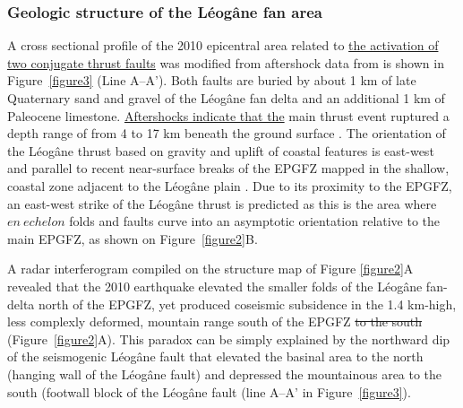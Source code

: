 \documentclass[linenumbers,draft]{agujournal}
\begin{document}
\subsubsection{Geologic structure of the L\'eog\^ane fan area}
A cross sectional profile of the 2010 epicentral area related to \ul{the activation of two conjugate thrust faults} was modified from aftershock data from \citet{douilly2013crustal,douilly2015three} is shown in Figure~\ref{figure3} (Line A--A'). Both faults are buried by about 1 km of late Quaternary sand and gravel of the L\'eog\^ane fan delta \citep{kocel2016near} and an additional 1 km of Paleocene limestone. \ul{Aftershocks indicate that the} main thrust event ruptured a depth range of from 4 to 17 km beneath the ground surface \citep{douilly2013crustal,douilly2015three}. The orientation of the L\'eog\^ane thrust based on gravity and uplift of coastal features is east-west and parallel to recent near-surface breaks of the EPGFZ mapped in the shallow, coastal zone adjacent to the L\'eog\^ane plain \citep{hornbach2010high}. Due to its proximity to the EPGFZ, an east-west strike of the L\'eog\^ane thrust is predicted as this is the area where $en~echelon$ folds and faults curve into an asymptotic orientation relative to the main EPGFZ, as shown on Figure~\ref{figure2}B.

A radar interferogram compiled on the structure map of Figure \ref{figure2}A revealed that the 2010 earthquake elevated the smaller folds of the L\'eog\^ane fan-delta north of the EPGFZ, yet produced coseismic subsidence in the 1.4 km-high, less complexly deformed, mountain range south of the EPGFZ \st{to the south} \citep{hashimoto2011fan} (Figure~\ref{figure2}A). This paradox can be simply explained by the northward dip of the seismogenic L\'eog\^ane fault that elevated the basinal area to the north (hanging wall of the L\'eog\^ane fault) and depressed the mountainous area to the south (footwall block of the L\'eog\^ane fault (line A--A' in Figure~\ref{figure3}). 
\end{document}
